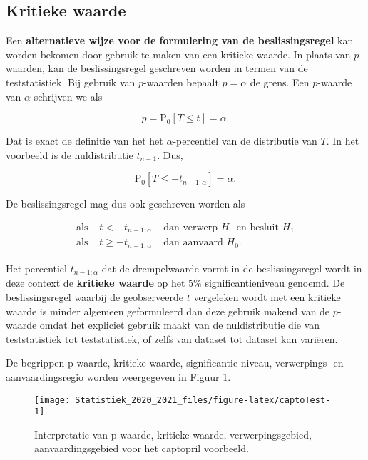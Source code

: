 \documentclass[
  12pt,dutch,coursenotes]{book}
\theoremstyle{definition}
\theoremstyle{definition}
\theoremstyle{definition}
\theoremstyle{remark}
\begin{document}
\hypertarget{kritieke-waarde}{%
\subsection{Kritieke waarde}\label{kritieke-waarde}}

Een \textbf{alternatieve wijze voor de formulering van de beslissingsregel} kan worden bekomen door gebruik te maken van een kritieke waarde.
In plaats van \(p\)-waarden, kan de beslissingsregel geschreven worden in termen van de teststatistiek.
Bij gebruik van \(p\)-waarden bepaalt \(p=\alpha\) de grens.
Een \(p\)-waarde van \(\alpha\) schrijven we als

\[p=\text{P}_0 \left[ T \leq t \right]=\alpha.\]

Dat is exact de definitie van het het \(\alpha\)-percentiel van de distributie van \(T\).
In het voorbeeld is de nuldistributie \(t_{n-1}\).
Dus,

\[\text{P}_0\left[T\leq -t_{n-1;\alpha}\right]=\alpha.\]

De beslissingsregel mag dus ook geschreven worden als

\begin{eqnarray*}
\text{als } & t< -t_{n-1;\alpha} & \text{ dan verwerp }H_0\text{ en besluit }H_1 \\
  \text{als } & t\geq -t_{n-1;\alpha} & \text{ dan aanvaard }H_0.
\end{eqnarray*}

Het percentiel \(t_{n-1;\alpha}\) dat de drempelwaarde vormt in de beslissingsregel wordt in deze context de \textbf{kritieke waarde} op het \(5\%\) significantieniveau genoemd.
De beslissingsregel waarbij de geobserveerde \(t\) vergeleken wordt met een kritieke waarde is minder algemeen geformuleerd dan deze gebruik makend van de \(p\)-waarde omdat het expliciet gebruik maakt van de nuldistributie die van teststatistiek tot teststatistiek, of zelfs van dataset tot dataset kan variëren.

De begrippen p-waarde, kritieke waarde, significantie-niveau, verwerpings- en aanvaardingsregio worden weergegeven in Figuur \ref{fig:captoTest}.

\begin{figure}

{\centering \texttt{[image: Statistiek\_2020\_2021\_files/figure-latex/captoTest-1]} 

}

\caption{Interpretatie van p-waarde, kritieke waarde, verwerpingsgebied, aanvaardingsgebied voor het captopril voorbeeld.}\label{fig:captoTest}
\end{figure}
\end{document}
